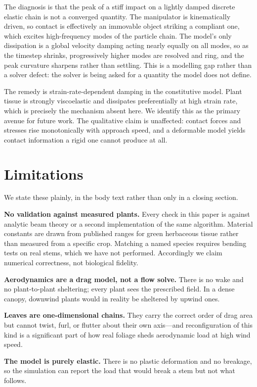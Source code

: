\documentclass[conference]{IEEEtran}
\begin{document}
The diagnosis is that the peak of a stiff impact on a lightly damped discrete
elastic chain is not a converged quantity. The manipulator is kinematically
driven, so contact is effectively an immovable object striking a compliant
one, which excites high-frequency modes of the particle chain. The model's
only dissipation is a global velocity damping acting nearly equally on all
modes, so as the timestep shrinks, progressively higher modes are resolved and
ring, and the peak curvature sharpens rather than settling. This is a
modelling gap rather than a solver defect: the solver is being asked for a
quantity the model does not define.

The remedy is strain-rate-dependent damping in the constitutive model. Plant
tissue is strongly viscoelastic and dissipates preferentially at high strain
rate, which is precisely the mechanism absent here. We identify this as the
primary avenue for future work. The qualitative claim is unaffected: contact
forces and stresses rise monotonically with approach speed, and a deformable
model yields contact information a rigid one cannot produce at all.

\section{Limitations}

We state these plainly, in the body text rather than only in a closing
section.

\textbf{No validation against measured plants.} Every check in this paper is
against analytic beam theory or a second implementation of the same
algorithm. Material constants are drawn from published ranges for green
herbaceous tissue rather than measured from a specific crop. Matching a named
species requires bending tests on real stems, which we have not performed.
Accordingly we claim numerical correctness, not biological fidelity.

\textbf{Aerodynamics are a drag model, not a flow solve.} There is no wake and
no plant-to-plant sheltering; every plant sees the prescribed field. In a
dense canopy, downwind plants would in reality be sheltered by upwind ones.

\textbf{Leaves are one-dimensional chains.} They carry the correct order of
drag area but cannot twist, furl, or flutter about their own axis---and
reconfiguration of this kind is a significant part of how real foliage sheds
aerodynamic load at high wind speed.

\textbf{The model is purely elastic.} There is no plastic deformation and no
breakage, so the simulation can report the load that would break a stem but
not what follows.
\end{document}
